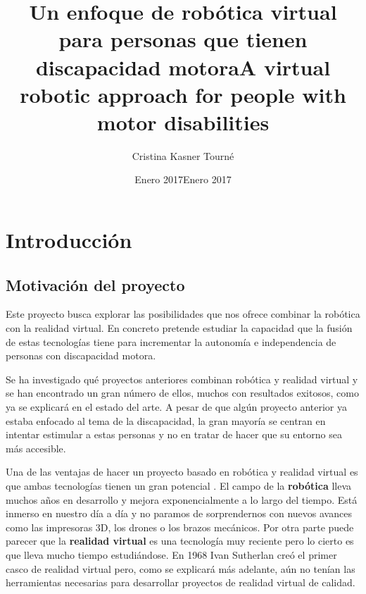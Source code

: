 \documentclass[twoside, 11pt]{epstfg}
\title[spa]{Un enfoque de robótica virtual para personas que tienen discapacidad motora}
\title[eng]{A virtual robotic approach for people with motor disabilities}
\author{Cristina Kasner Tourné}
\date[spa]{Enero 2017}
\date[eng]{Enero 2017}
\begin{document}

\frontmatter

\maketitle[spa]

\makeinnertitle[spa]

\makeabstract[spa]
\makeabstract[eng]

\tableofcontents
\clearpage
\listoftables
\clearpage
\listoffigures
\cleardoublepage

\printnoidxglossaries

\mainmatter
\chapter{Introducción} 


\section{Motivación del proyecto}

Este proyecto busca explorar las posibilidades que nos ofrece combinar la robótica con la realidad virtual. En concreto pretende estudiar la capacidad que la fusión de estas tecnologías tiene para incrementar la autonomía e independencia de personas con discapacidad motora.

Se ha investigado qué proyectos anteriores combinan robótica y realidad virtual y se han encontrado un gran número de ellos, muchos con resultados exitosos, como ya se explicará en el estado del arte. A pesar de que algún proyecto anterior ya estaba enfocado al tema de la discapacidad, la gran mayoría se centran en intentar estimular a estas personas y no en tratar de hacer que su entorno sea más accesible.

Una de las ventajas de hacer un proyecto basado en robótica y realidad virtual es que ambas tecnologías tienen un gran potencial \cite{tahriri2015optimizing}.
El campo de la \textbf{robótica} lleva muchos años en desarrollo y mejora exponencialmente a lo largo del tiempo. Está inmerso en nuestro día a día y no paramos de sorprendernos con nuevos avances como las impresoras 3D, los drones o los brazos mecánicos.
Por otra parte puede parecer que la \textbf{realidad virtual} es una tecnología muy reciente pero lo cierto es que  lleva mucho tiempo estudiándose. En 1968 Ivan Sutherlan creó el primer casco de realidad virtual pero, como se explicará más adelante, aún no tenían las herramientas necesarias para desarrollar proyectos de realidad virtual de calidad.
\end{document}
